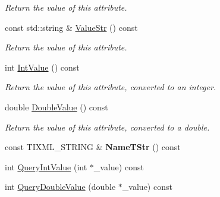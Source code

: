 \begin{DoxyCompactItemize}
\begin{DoxyCompactList}\small\item\em Return the value of this attribute. \item\end{DoxyCompactList}\item 
\hypertarget{class_ti_xml_attribute_a87705c3ccf9ee9417beb4f7cbacd4d33}{
const std::string \& \hyperlink{class_ti_xml_attribute_a87705c3ccf9ee9417beb4f7cbacd4d33}{ValueStr} () const }
\label{class_ti_xml_attribute_a87705c3ccf9ee9417beb4f7cbacd4d33}

\begin{DoxyCompactList}\small\item\em Return the value of this attribute. \item\end{DoxyCompactList}\item 
\hypertarget{class_ti_xml_attribute_aa1a20ad59dc7e89a0ab265396360d50f}{
int \hyperlink{class_ti_xml_attribute_aa1a20ad59dc7e89a0ab265396360d50f}{IntValue} () const }
\label{class_ti_xml_attribute_aa1a20ad59dc7e89a0ab265396360d50f}

\begin{DoxyCompactList}\small\item\em Return the value of this attribute, converted to an integer. \item\end{DoxyCompactList}\item 
\hypertarget{class_ti_xml_attribute_a2880ddef53fc7522c99535273954d230}{
double \hyperlink{class_ti_xml_attribute_a2880ddef53fc7522c99535273954d230}{DoubleValue} () const }
\label{class_ti_xml_attribute_a2880ddef53fc7522c99535273954d230}

\begin{DoxyCompactList}\small\item\em Return the value of this attribute, converted to a double. \item\end{DoxyCompactList}\item 
\hypertarget{class_ti_xml_attribute_a64cee17bceb8232eb0736d26dd082d79}{
const TIXML\_\-STRING \& {\bfseries NameTStr} () const }
\label{class_ti_xml_attribute_a64cee17bceb8232eb0736d26dd082d79}

\item 
int \hyperlink{class_ti_xml_attribute_ad6c93088ee21af41a107931223339344}{QueryIntValue} (int $\ast$\_\-value) const 
\item 
\hypertarget{class_ti_xml_attribute_ac87b2a8489906a5d7aa2875f20be3513}{
int \hyperlink{class_ti_xml_attribute_ac87b2a8489906a5d7aa2875f20be3513}{QueryDoubleValue} (double $\ast$\_\-value) const }
\label{class_ti_xml_attribute_ac87b2a8489906a5d7aa2875f20be3513}


\end{DoxyCompactItemize}
